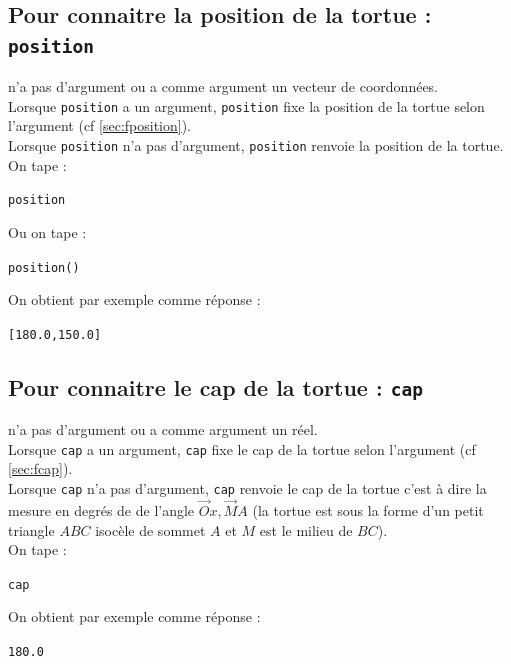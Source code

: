 \documentclass[a4paper,11pt]{book}
\begin{document}
\subsection{Pour connaitre la position de la tortue : {\tt position}}\label{sec:position}
 n'a pas d'argument ou a comme argument un vecteur de 
coordonn\'ees.\\
 Lorsque {\tt position} a un argument, {\tt position} fixe la position de la 
tortue selon l'argument (cf \ref{sec:fposition}).\\
Lorsque {\tt position} n'a pas d'argument, {\tt position} renvoie la position 
de la tortue.\\
On tape :
\begin{center}{\tt position}\end{center}
Ou on tape :
\begin{center}{\tt position()}\end{center}
On obtient par exemple comme r\'eponse :
\begin{center}{\tt [180.0,150.0]}\end{center}


\subsection{Pour connaitre le cap de la tortue : {\tt cap}}\label{sec:cap}
 n'a pas d'argument ou a comme argument un r\'eel.\\
 Lorsque {\tt cap} a un argument, {\tt cap} fixe le cap de la tortue selon 
l'argument (cf \ref{sec:fcap}).\\
Lorsque {\tt cap} n'a pas d'argument, {\tt cap} renvoie le cap de la tortue 
c'est \`a dire la mesure en degr\'es de  de l'angle 
$\overrightarrow Ox,\overrightarrow MA$ (la tortue est sous la forme d'un petit
 triangle $ABC$ isoc\`ele de sommet $A$ et $M$ est le milieu de $BC$).\\
On tape :
\begin{center}{\tt cap}\end{center}
On obtient  par exemple comme r\'eponse :
\begin{center}{\tt 180.0}\end{center}
\end{document}
